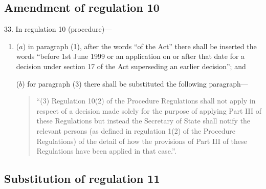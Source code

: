 \documentclass[12pt,a4paper]{article}
\begin{document}
\subsection[33. Amendment of regulation 10]{Amendment of regulation 10}

33.  In regulation 10 (procedure)—
\begin{enumerate}\item[]
($a$) in paragraph (1), after the words “of the Act” there shall be inserted the words “before 1st June 1999 or an application on or after that date for a decision under section 17 of the Act superseding an earlier decision”; and

($b$) for paragraph (3) there shall be substituted the following paragraph—
\begin{quotation}
“(3) Regulation 10(2) of the Procedure Regulations shall not apply in respect of a decision made solely for the purpose of applying Part III of these Regulations but instead the Secretary of State shall notify the relevant persons (as defined in regulation 1(2) of the Procedure Regulations) of the detail of how the provisions of Part III of these Regulations have been applied in that case.”.
\end{quotation}
\end{enumerate}

\subsection[34. Substitution of regulation 11]{Substitution of regulation 11}
\end{document}
